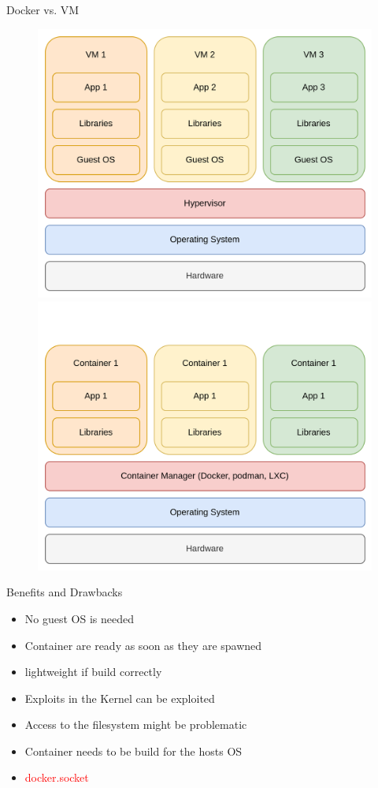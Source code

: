 \documentclass[12pt]{beamer}
\begin{document}
\begin{frame}{Docker vs. VM}
   \begin{figure}
        \includegraphics[width=.48\linewidth]{images/virtualisation_vs_container_vm.png}\hfill
        \pause
        \includegraphics[width=.48\linewidth]{images/virtualisation_vs_container_docker.png}
    \end{figure} 
\end{frame}

\begin{frame}{Benefits and Drawbacks}
    \begin{itemize}[label=\textcolor{green}{\textbullet}]
        \item No guest OS is needed
        \item Container are ready as soon as they are spawned
        \item lightweight if build correctly
    \end{itemize}
    \begin{itemize}[label=\textcolor{red}{\textbullet}]
        \item Exploits in the Kernel can be exploited
        \item Access to the filesystem might be problematic
        \item Container needs to be build for the hosts OS
        \item \textcolor{red}{docker.socket}
    \end{itemize}
\end{frame}
\end{document}
